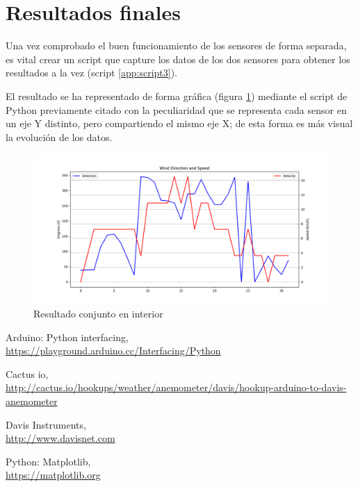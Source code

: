 \documentclass[a4paper, 11pt]{article}
\begin{document}
\section{Resultados finales}
Una vez comprobado el buen funcionamiento de los sensores de forma separada, es vital crear un script que capture los datos de los dos sensores para obtener los resultados a la vez (script \ref{app:script3}). 

El resultado se ha representado de forma gráfica  (figura \ref{fig:testfull}) mediante el script de Python previamente citado con la peculiaridad que se representa cada sensor en un eje Y distinto, pero compartiendo el mismo eje X; de esta forma es más visual la evolución de los datos.

\begin{figure}[h]
	\center
	\includegraphics[width=1\textwidth]{img/testFullInEN.png}
	\caption{Resultado conjunto en interior}
	\label{fig:testfull}
\end{figure}
\newpage

\begin{thebibliography}{9}
Arduino: Python interfacing,
\\\url{https://playground.arduino.cc/Interfacing/Python}

Cactus io,
\\\url{http://cactus.io/hookups/weather/anemometer/davis/hookup-arduino-to-davis-anemometer}

Davis Instruments,
\\\url{http://www.davisnet.com}

Python: Matplotlib,
\\\url{https://matplotlib.org}
\end{thebibliography}
\newpage
\end{document}
